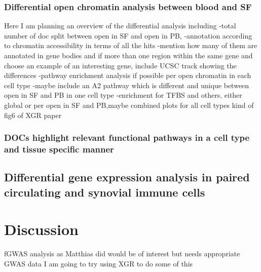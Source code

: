 \subsubsection{Differential open chromatin analysis between blood and SF}

Here I am planning an overview of the differential analysis including 
-total number of doc split between open in SF and open in PB,
-annotation according to chromatin accessibility in terms of all the hits
-mention how many of them are annotated in gene bodies and if more than one region within the same gene and choose an example of an interesting gene, include UCSC track showing the differences
-pathway enrichment analysis if possible per open chromatin in each cell type
-maybe include an A2 pathway which is different and unique between open in SF and PB in one cell type
-enrichment for TFBS and others, either global or per open in SF and PB,maybe combined plots for all cell types kind of fig6 of XGR paper




\subsubsection{DOCs highlight relevant functional pathways in a cell type and tissue specific manner}


\subsection{Differential gene expression analysis in paired circulating and synovial immune cells}


\section{Discussion}
%


fGWAS analysis as Matthias did would be of interest but needs appropriate GWAS data
I am going to try using XGR to do some of this 



